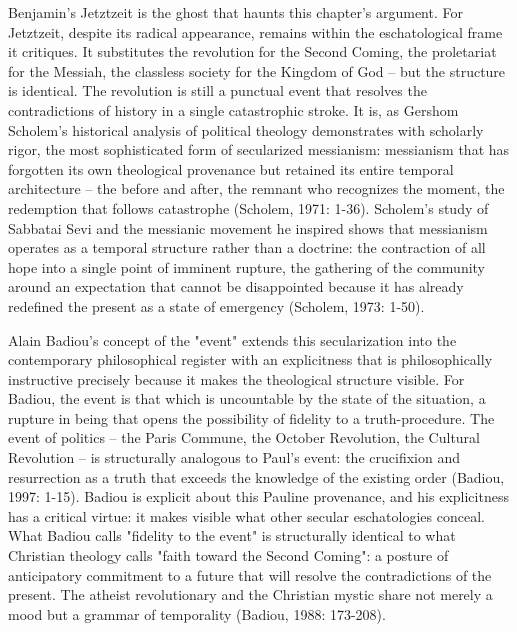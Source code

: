 Benjamin's Jetztzeit is the ghost that haunts this chapter's argument. For Jetztzeit, despite its radical appearance, remains within the eschatological frame it critiques. It substitutes the revolution for the Second Coming, the proletariat for the Messiah, the classless society for the Kingdom of God -- but the structure is identical. The revolution is still a punctual event that resolves the contradictions of history in a single catastrophic stroke. It is, as Gershom Scholem's historical analysis of political theology demonstrates with scholarly rigor, the most sophisticated form of secularized messianism: messianism that has forgotten its own theological provenance but retained its entire temporal architecture -- the before and after, the remnant who recognizes the moment, the redemption that follows catastrophe (Scholem, 1971: 1-36). Scholem's study of Sabbatai Sevi and the messianic movement he inspired shows that messianism operates as a temporal structure rather than a doctrine: the contraction of all hope into a single point of imminent rupture, the gathering of the community around an expectation that cannot be disappointed because it has already redefined the present as a state of emergency (Scholem, 1973: 1-50).

Alain Badiou's concept of the "event" extends this secularization into the contemporary philosophical register with an explicitness that is philosophically instructive precisely because it makes the theological structure visible. For Badiou, the event is that which is uncountable by the state of the situation, a rupture in being that opens the possibility of fidelity to a truth-procedure. The event of politics -- the Paris Commune, the October Revolution, the Cultural Revolution -- is structurally analogous to Paul's event: the crucifixion and resurrection as a truth that exceeds the knowledge of the existing order (Badiou, 1997: 1-15). Badiou is explicit about this Pauline provenance, and his explicitness has a critical virtue: it makes visible what other secular eschatologies conceal. What Badiou calls "fidelity to the event" is structurally identical to what Christian theology calls "faith toward the Second Coming": a posture of anticipatory commitment to a future that will resolve the contradictions of the present. The atheist revolutionary and the Christian mystic share not merely a mood but a grammar of temporality (Badiou, 1988: 173-208).

